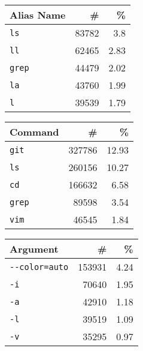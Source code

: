 \begin{tabular}{lrr}
\toprule
   Alias Name &           \# &          \% \\
\midrule
    \verb|ls| &  \num{83782} &   \num{3.8} \\
    \verb|ll| &  \num{62465} &  \num{2.83} \\
  \verb|grep| &  \num{44479} &  \num{2.02} \\
    \verb|la| &  \num{43760} &  \num{1.99} \\
     \verb|l| &  \num{39539} &  \num{1.79} \\
\bottomrule
\end{tabular}
\hspace{0.3cm}
\begin{tabular}{lrr}
    \toprule
           Command &            \# &           \% \\
    \midrule
        \verb|git| &  \num{327786} &  \num{12.93} \\
         \verb|ls| &  \num{260156} &  \num{10.27} \\
         \verb|cd| &  \num{166632} &   \num{6.58} \\
       \verb|grep| &   \num{89598} &   \num{3.54} \\
        \verb|vim| &   \num{46545} &   \num{1.84} \\
    \bottomrule
\end{tabular}
\hspace{0.3cm}
\begin{tabular}{lrr}
    \toprule
                Argument &            \# &          \% \\
    \midrule
     \verb|--color=auto| &  \num{153931} &  \num{4.24} \\
               \verb|-i| &   \num{70640} &  \num{1.95} \\
               \verb|-a| &   \num{42910} &  \num{1.18} \\
               \verb|-l| &   \num{39519} &  \num{1.09} \\
               \verb|-v| &   \num{35295} &  \num{0.97} \\
    \bottomrule
\end{tabular}

